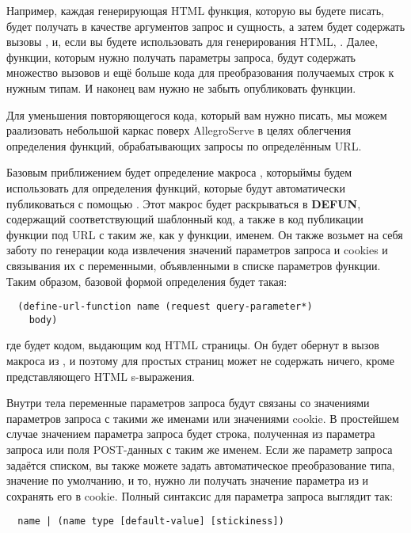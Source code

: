 Например, каждая генерирующая HTML функция, которую вы будете писать, будет получать в
качестве аргументов запрос и сущность, а затем будет содержать вызовы
,  и, если вы будете использовать 
для генерирования HTML, . Далее, функции, которым нужно получать
параметры запроса, будут содержать множество вызовов  и ещё
больше кода для преобразования получаемых строк к нужным типам. И наконец вам нужно не
забыть опубликовать функции.

Для уменьшения повторяющегося кода, который вам нужно писать, мы можем раализовать
небольшой каркас поверх AllegroServe в целях облегчения определения функций,
обрабатывающих запросы по определённым URL.

Базовым приближением будет определение макроса , которыймы будем
использовать для определения функций, которые будут автоматически публиковаться с помощью
. Этот макрос будет раскрываться в \textbf{DEFUN}, содержащий
соответствующий шаблонный код, а также в код публикации функции под URL с таким же, как у
функции, именем. Он также возьмет на себя заботу по генерации кода извлечения значений
параметров запроса и cookies и связывания их с переменными, объявленными в списке
параметров функции. Таким образом, базовой формой определения 
будет такая:

\begin{lstlisting}
  (define-url-function name (request query-parameter*)
    body)
\end{lstlisting}

где  будет кодом, выдающим код HTML страницы. Он будет обернут в вызов макроса
 из , и поэтому для простых страниц может не содержать ничего, кроме
представляющего HTML s-выражения.

Внутри тела переменные параметров запроса будут связаны со значениями параметров запроса с
такими же именами или значениями cookie. В простейшем случае значением параметра запроса
будет строка, полученная из параметра запроса или поля POST-данных с таким же именем. Если
же параметр запроса задаётся списком, вы также можете задать автоматическое преобразование
типа, значение по умолчанию, и то, нужно ли получать значение параметра из и сохранять его
в cookie. Полный синтаксис для параметра запроса выглядит так:

\begin{verbatim}
  name | (name type [default-value] [stickiness])
\end{verbatim}

